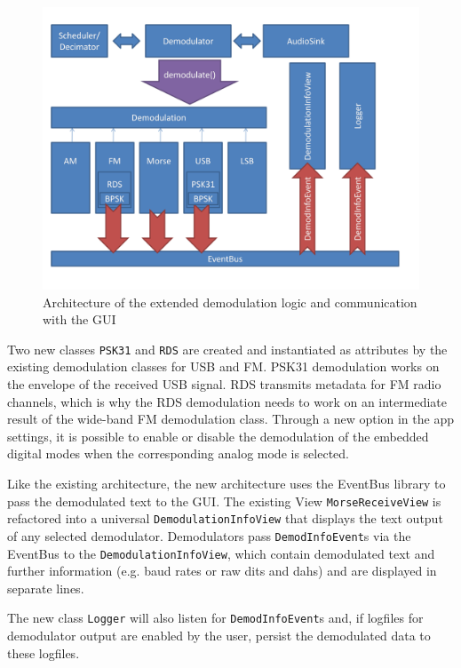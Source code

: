 \begin{figure}
	\centering
	\includegraphics[width=1\linewidth]{gfx/demod_text_eventbus.png}
	\caption{Architecture of the extended demodulation logic and communication with the GUI}
	\label{fig:demod_text_eventbus}
\end{figure}

Two new classes \texttt{PSK31} and \texttt{RDS} are created and instantiated as attributes by the existing demodulation classes for \ac{USB} and \ac{FM}. \ac{PSK31} demodulation
works on the envelope of the received \ac{USB} signal. \ac{RDS} transmits
metadata for \ac{FM} radio channels, which is why the \ac{RDS} demodulation
needs to work on an intermediate result of the wide-band \ac{FM} demodulation
class. Through a new option in the app settings, it is possible to enable
or disable the demodulation of the embedded digital modes when the
corresponding analog mode is selected.

Like the existing architecture, the new architecture uses the EventBus
library to pass the demodulated text to the \ac{GUI}. The existing View
\texttt{MorseReceiveView} is refactored into a universal
\texttt{De\-mo\-du\-la\-tion\-In\-fo\-View} that displays the text output of any selected 
demodulator. Demodulators pass
\texttt{DemodInfoEvent}s via the EventBus to the \texttt{De\-mo\-du\-la\-tion\-In\-fo\-View}, 
which contain demodulated text and further information (e.g. baud rates or raw 
dits and dahs) and are displayed in separate lines.

The new class \texttt{Logger} will also listen for \texttt{DemodInfoEvent}s and, if logfiles for demodulator output are enabled by the user, persist the demodulated data to these logfiles.

